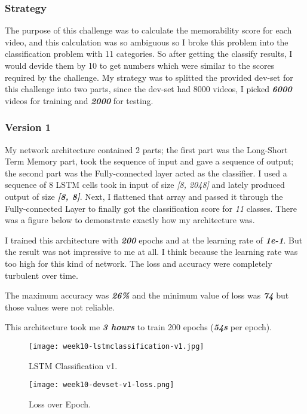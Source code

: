 \subsubsection{Strategy}
The purpose of this challenge was to calculate the memorability score for each video, and this calculation was so ambiguous so I broke this problem into the classification problem with 11 categories. So after getting the classify results, I would devide them by 10 to get numbers which were similar to the scores required by the challenge. My strategy was to splitted the provided dev-set for this challenge into two parts, since the dev-set had 8000 videos, I picked \textbf{\emph{6000}} videos for training and \textbf{\emph{2000}} for testing.

\subsubsection{Version 1}
My network architecture contained 2 parts; the first part was the Long-Short Term Memory part, took the sequence of input and gave a sequence of output; the second part was the Fully-connected layer acted as the classifier. I used a sequence of 8 LSTM cells took in input of size \emph{[8, 2048]} and lately produced output of size \textbf{\emph{[8, 8]}}. Next, I flattened that array and passed it through the Fully-connected Layer to finally got the classification score for \emph{11} classes. There was a figure below to demonstrate exactly how my architecture was.

I trained this architecture with \textbf{\emph{200}} epochs and at the learning rate of \textbf{\emph{1e-1}}. But the result was not impressive to me at all. I think because the learning rate was too high for this kind of network. The loss and accuracy were completely turbulent over time.

The maximum accuracy was \textbf{\emph{26\%}} and the minimum value of loss was \textbf{\emph{74}} but those values were not reliable.

This architecture took me \textbf{\emph{3 hours}} to train 200 epochs (\textbf{\emph{54s}} per epoch).

\begin{figure}[!ht]
\centering
\texttt{[image: week10-lstmclassification-v1.jpg]}
\caption{LSTM Classification v1.}
\end{figure}

\begin{figure}[!ht]
\centering
\texttt{[image: week10-devset-v1-loss.png]}
\caption{Loss over Epoch.}
\end{figure}

